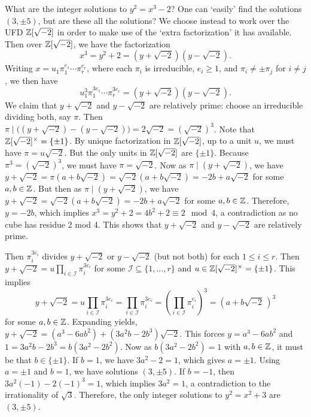 \begin{ex}
What are the integer solutions to $y^2= x^3 - 2$? One can `easily' find the solutions $(3, \pm 5)$, but are these all the solutions? We choose instead to work over the UFD $\mathbb{Z}[\sqrt{-2}]$ in order to make use of the `extra factorization' it has available. Then over $\mathbb{Z}[\sqrt{-2}]$, we have the factorization 
	\[
	x^3= y^2 + 2= (y + \sqrt{-2}) (y - \sqrt{-2}). 
	\]
Writing $x=u_1 \pi_1^{e_1}\cdots \pi_r^{e_r}$, where each $\pi_i$ is irreducible, $e_i \geq 1$, and $\pi_i \neq \pm \pi_j$ for $i \neq j$, we then have
	\[
	u_1^3 \pi_1^{3e_1}\cdots \pi_r^{3e_r}=(y+\sqrt{-2})(y-\sqrt{-2}). 
	\]
We claim that $y + \sqrt{-2}$ and $y - \sqrt{-2}$ are relatively prime: choose an irreducible dividing both, say $\pi$. Then $\pi \mid \big(( y + \sqrt{-2}) - (y - \sqrt{-2}) \big)= 2\sqrt{-2}= (\sqrt{-2})^3$. Note that $\mathbb{Z}[\sqrt{-2}]^\times=\{\pm 1\}$. By unique factorization in $\mathbb{Z}[\sqrt{-2}]$, up to a unit $u$, we must have $\pi= u\sqrt{-2}$. But the only units in $\mathbb{Z}[\sqrt{-2}]$ are $\{\pm 1\}$. Because $\pi^3= (\sqrt{-2})^3$, we must have $\pi= \sqrt{-2}$. Now as $\pi \mid (y + \sqrt{-2})$, we have $y + \sqrt{-2} = \pi (a + b \sqrt{-2})= \sqrt{-2} (a + b\sqrt{-2})= -2b + a\sqrt{-2}$ for some $a, b \in \mathbb{Z}$. But then as $\pi \mid (y + \sqrt{-2})$, we have $y + \sqrt{-2}= \sqrt{-2}(a + b\sqrt{-2})= -2b + a\sqrt{-2}$ for some $a, b \in \mathbb{Z}$. Therefore, $y= -2b$, which implies $x^3= y^2 + 2= 4b^2+2 \equiv 2 \mod 4$, a contradiction as no cube has residue 2 mod 4. This shows that $y + \sqrt{-2}$ and $y - \sqrt{-2}$ are relatively prime.

Then $\pi_i^{3e_i}$ divides $y + \sqrt{-2}$ or $y-\sqrt{-2}$ (but not both) for each $1 \leq i \leq r$. Then $y+\sqrt{-2}= u \prod_{i \in \mathcal{I}} \pi_i^{3e_i}$ for some $\mathcal{I} \subseteq \{ 1, \ldots, r \}$ and $u \in \mathbb{Z}[\sqrt{-2}]^\times= \{ \pm 1 \}$. This implies 
	\[
	y + \sqrt{-2}= u \prod_{i \in \mathcal{I}} \pi_i^{3e_i}= \prod_{i \in \mathcal{I}} \pi_i^{3e_i}= \left( \prod_{i \in \mathcal{I}} \pi_i^{e_i} \right)^3= (a + b\sqrt{-2} \,)^3
	\]
 for some $a,b \in \mathbb{Z}$. Expanding yields, $y+\sqrt{-2}=(a^3-6ab^2)+(3a^2b-2b^3)\sqrt{-2}$. This forces $y= a^3 - 6ab^2$ and $1= 3a^2b - 2b^3= b(3a^2 - 2b^2)$. Now as $b (3a^2 - 2b^2)= 1$ with $a, b \in \mathbb{Z}$, it must be that $b \in \{\pm 1\}$. If $b= 1$, we have $3a^2 - 2= 1$, which gives $a= \pm 1$. Using $a= \pm 1$ and $b=1$, we have solutions $(3, \pm 5)$. If $b= -1$, then $3a^2(-1)-2(-1)^3=1$, which implies $3a^2=1$, a contradiction to the irrationality of $\sqrt{3}$. Therefore, the only integer solutions to $y^2= x^2 + 3$ are $(3, \pm 5)$. 


\end{ex}
